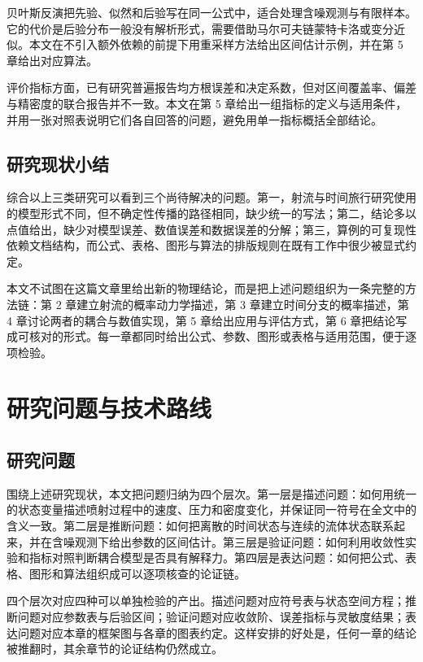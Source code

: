 贝叶斯反演把先验、似然和后验写在同一公式中，适合处理含噪观测与有限样本。它的代价是后验分布一般没有解析形式，需要借助马尔可夫链蒙特卡洛或变分近似。本文在不引入额外依赖的前提下用重采样方法给出区间估计示例，并在第 5 章给出对应算法。

评价指标方面，已有研究普遍报告均方根误差和决定系数，但对区间覆盖率、偏差与精密度的联合报告并不一致。本文在第 5 章给出一组指标的定义与适用条件，并用一张对照表说明它们各自回答的问题，避免用单一指标概括全部结论。

\subsection{研究现状小结}

综合以上三类研究可以看到三个尚待解决的问题。第一，射流与时间旅行研究使用的模型形式不同，但不确定性传播的路径相同，缺少统一的写法；第二，结论多以点值给出，缺少对模型误差、数值误差和数据误差的分解；第三，算例的可复现性依赖文档结构，而公式、表格、图形与算法的排版规则在既有工作中很少被显式约定。

本文不试图在这篇文章里给出新的物理结论，而是把上述问题组织为一条完整的方法链：第 2 章建立射流的概率动力学描述，第 3 章建立时间分支的概率描述，第 4 章讨论两者的耦合与数值实现，第 5 章给出应用与评估方式，第 6 章把结论写成可核对的形式。每一章都同时给出公式、参数、图形或表格与适用范围，便于逐项检验。

\section{研究问题与技术路线}

\subsection{研究问题}

围绕上述研究现状，本文把问题归纳为四个层次。第一层是描述问题：如何用统一的状态变量描述喷射过程中的速度、压力和密度变化，并保证同一符号在全文中的含义一致。第二层是推断问题：如何把离散的时间状态与连续的流体状态联系起来，并在含噪观测下给出参数的区间估计。第三层是验证问题：如何利用收敛性实验和指标对照判断耦合模型是否具有解释力。第四层是表达问题：如何把公式、表格、图形和算法组织成可以逐项核查的论证链。

四个层次对应四种可以单独检验的产出。描述问题对应符号表与状态空间方程；推断问题对应参数表与后验区间；验证问题对应收敛阶、误差指标与灵敏度结果；表达问题对应本章的框架图与各章的图表约定。这样安排的好处是，任何一章的结论被推翻时，其余章节的论证结构仍然成立。

